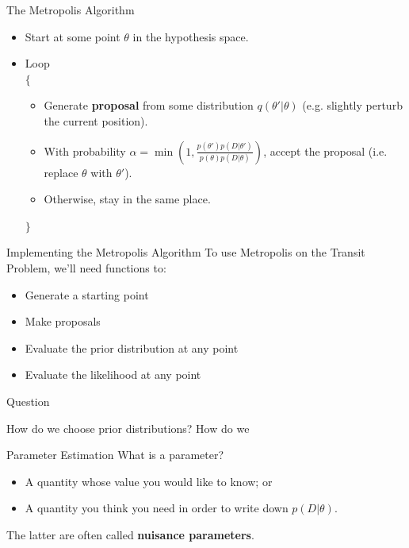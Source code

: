 \begin{frame}[t]{The Metropolis Algorithm}

\begin{itemize}
\item Start at some point $\theta$ in the hypothesis space.
\item Loop\\
$\{$
  \begin{itemize}
  \item Generate {\bf proposal} from some distribution $q(\theta' | \theta)$
  (e.g. slightly perturb the current position).
  \item With probability $\alpha = \min\left(1, \frac{p(\theta')p(D|\theta')}{p(\theta)p(D|\theta)}\right)$, accept the proposal (i.e. replace $\theta$ with $\theta'$).
  \item Otherwise, stay in the same place.
  \end{itemize}
$\}$
\end{itemize}
\end{frame}

\begin{frame}[t]{Implementing the Metropolis Algorithm}
To use Metropolis on the Transit Problem, we'll need functions to:
\begin{itemize}
\item Generate a starting point
\item Make proposals
\item Evaluate the prior distribution at any point
\item Evaluate the likelihood at any point
\end{itemize}
\end{frame}


\begin{frame}[t]{Question}

How do we choose prior distributions?
How do we 

\end{frame}



\begin{frame}[t]{Parameter Estimation}
What is a parameter?

\begin{itemize}
\item A quantity whose value you would like to know; or
\item A quantity you think you need in order to write down
$p(D | \theta)$.
\end{itemize}

The latter are often called {\bf nuisance parameters}.
\end{frame}




